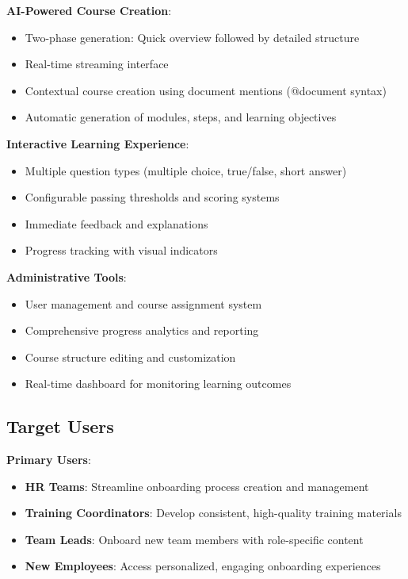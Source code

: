 \documentclass[a4paper,11pt]{article}
\begin{document}
\textbf{AI-Powered Course Creation}:
\begin{itemize}
    \item Two-phase generation: Quick overview followed by detailed structure
    \item Real-time streaming interface
    \item Contextual course creation using document mentions (@document syntax)
    \item Automatic generation of modules, steps, and learning objectives
\end{itemize}

\textbf{Interactive Learning Experience}:
\begin{itemize}
    \item Multiple question types (multiple choice, true/false, short answer)
    \item Configurable passing thresholds and scoring systems
    \item Immediate feedback and explanations
    \item Progress tracking with visual indicators
\end{itemize}

\textbf{Administrative Tools}:
\begin{itemize}
    \item User management and course assignment system
    \item Comprehensive progress analytics and reporting
    \item Course structure editing and customization
    \item Real-time dashboard for monitoring learning outcomes
\end{itemize}

\subsection{Target Users}

\textbf{Primary Users}:
\begin{itemize}
    \item \textbf{HR Teams}: Streamline onboarding process creation and management
    \item \textbf{Training Coordinators}: Develop consistent, high-quality training materials
    \item \textbf{Team Leads}: Onboard new team members with role-specific content
    \item \textbf{New Employees}: Access personalized, engaging onboarding experiences
\end{itemize}
\end{document}
